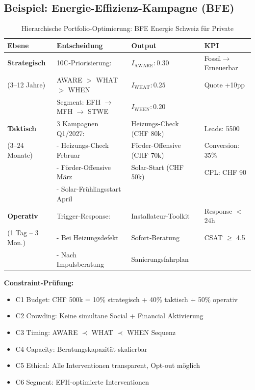 \subsection{Beispiel: Energie-Effizienz-Kampagne (BFE)}
\label{sec:20-hierarchical-example}

\begin{table}[htbp]
\centering
\caption{Hierarchische Portfolio-Optimierung: BFE Energie Schweiz für Private}
\label{tab:20-bfe-example}
\renewcommand{\arraystretch}{1.4}
\small
\begin{tabular}{@{}llll@{}}
\toprule
\textbf{Ebene} & \textbf{Entscheidung} & \textbf{Output} & \textbf{KPI} \\
\midrule
\textbf{Strategisch} & 10C-Priorisierung: & $I_{\text{AWARE}}: 0.30$ & Fossil$\rightarrow$Erneuerbar \\
(3--12 Jahre) & AWARE $>$ WHAT $>$ WHEN & $I_{\text{WHAT}}: 0.25$ & Quote +10pp \\
& Segment: EFH $\rightarrow$ MFH $\rightarrow$ STWE & $I_{\text{WHEN}}: 0.20$ & \\
\midrule
\textbf{Taktisch} & 3 Kampagnen Q1/2027: & Heizungs-Check (CHF 80k) & Leads: 5500 \\
(3--24 Monate) & - Heizungs-Check Februar & Förder-Offensive (CHF 70k) & Conversion: 35\% \\
& - Förder-Offensive März & Solar-Start (CHF 50k) & CPL: CHF 90 \\
& - Solar-Frühlingsstart April & & \\
\midrule
\textbf{Operativ} & Trigger-Response: & Installateur-Toolkit & Response $<$ 24h \\
(1 Tag -- 3 Mon.) & - Bei Heizungsdefekt & Sofort-Beratung & CSAT $\geq$ 4.5 \\
& - Nach Impulsberatung & Sanierungsfahrplan & \\
\bottomrule
\end{tabular}
\end{table}

\textbf{Constraint-Prüfung:}
\begin{itemize}[nosep]
\item C1 Budget: CHF 500k = 10\% strategisch + 40\% taktisch + 50\% operativ \checkmark
\item C2 Crowding: Keine simultane Social + Financial Aktivierung \checkmark
\item C3 Timing: AWARE $\prec$ WHAT $\prec$ WHEN Sequenz \checkmark
\item C4 Capacity: Beratungskapazität skalierbar \checkmark
\item C5 Ethical: Alle Interventionen transparent, Opt-out möglich \checkmark
\item C6 Segment: EFH-optimierte Interventionen \checkmark
\end{itemize}



